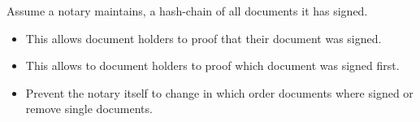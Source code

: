 \begin{example}
Assume a notary maintains, a hash-chain of all documents it has signed. 
\begin{itemize}
	\item This allows document holders to proof that their document was signed.
	\item This allows to document holders to proof which document was signed first.
	\item Prevent the notary itself to change in which order documents where signed or remove single documents.
\end{itemize}
\end{example}
